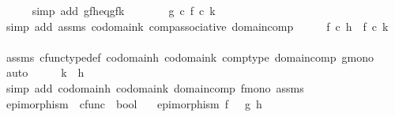 \begin{isabellebody}
\ \ \ \ \isamarkupfalse%
\ {\isacharparenleft}{\kern0pt}simp\ add{\isacharcolon}{\kern0pt}\ gfh{\isacharunderscore}{\kern0pt}eq{\isacharunderscore}{\kern0pt}gfk{\isacharparenright}{\kern0pt}\isanewline
\ \ \isamarkupfalse%
\ \isamarkupfalse%
\ {\isachardoublequoteopen}{\isachardot}{\kern0pt}{\isachardot}{\kern0pt}{\isachardot}{\kern0pt}\ {\isacharequal}{\kern0pt}\ g\ {\isasymcirc}\isactrlsub c\ {\isacharparenleft}{\kern0pt}f\ {\isasymcirc}\isactrlsub c\ k{\isacharparenright}{\kern0pt}{\isachardoublequoteclose}\isanewline
\ \ \ \ \isamarkupfalse%
\ {\isacharparenleft}{\kern0pt}simp\ add{\isacharcolon}{\kern0pt}\ assms\ codomain{\isacharunderscore}{\kern0pt}k\ comp{\isacharunderscore}{\kern0pt}associative\ domain{\isacharunderscore}{\kern0pt}comp{\isacharparenright}{\kern0pt}\isanewline
\ \ \isamarkupfalse%
\ \isamarkupfalse%
\ {\isachardoublequoteopen}f\ {\isasymcirc}\isactrlsub c\ h\ {\isacharequal}{\kern0pt}\ f\ {\isasymcirc}\isactrlsub c\ k{\isachardoublequoteclose}\isanewline
\ \ \ \ \isamarkupfalse%
\ assms\ cfunc{\isacharunderscore}{\kern0pt}type{\isacharunderscore}{\kern0pt}def\ codomain{\isacharunderscore}{\kern0pt}h\ codomain{\isacharunderscore}{\kern0pt}k\ comp{\isacharunderscore}{\kern0pt}type\ domain{\isacharunderscore}{\kern0pt}comp\ g{\isacharunderscore}{\kern0pt}mono\ \isamarkupfalse%
\ auto\isanewline
\ \ \isamarkupfalse%
\ \isamarkupfalse%
\ {\isachardoublequoteopen}k\ {\isacharequal}{\kern0pt}\ h{\isachardoublequoteclose}\isanewline
\ \ \ \ \isamarkupfalse%
\ {\isacharparenleft}{\kern0pt}simp\ add{\isacharcolon}{\kern0pt}\ codomain{\isacharunderscore}{\kern0pt}h\ codomain{\isacharunderscore}{\kern0pt}k\ domain{\isacharunderscore}{\kern0pt}comp\ f{\isacharunderscore}{\kern0pt}mono\ assms{\isacharparenright}{\kern0pt}\isanewline
{}\isamarkupfalse%
%
\endisatagproof
{\isafoldproof}%
%
\isadelimproof
%
\endisadelimproof
%
\isadelimdocument
%
\endisadelimdocument
%
\isatagdocument
%
\isamarkuptrue%
%
\endisatagdocument
{\isafolddocument}%
%
\isadelimdocument
%
\endisadelimdocument
{}\isamarkupfalse%
\ epimorphism\ {\isacharcolon}{\kern0pt}{\isacharcolon}{\kern0pt}\ {\isachardoublequoteopen}cfunc\ {\isasymRightarrow}\ bool{\isachardoublequoteclose}\ \isanewline
\ \ {\isachardoublequoteopen}epimorphism\ f\ {\isasymlongleftrightarrow}\ {\isacharparenleft}{\kern0pt}{\isasymforall}\ g\ h{\isachardot}{\kern0pt}\ \isanewline

\end{isabellebody}
